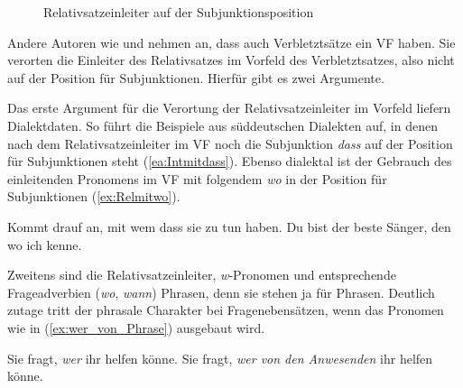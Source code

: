 \begin{figure}[!htbp]
  \centering
  \caption{Relativsatzeinleiter auf der Subjunktionsposition}
  \label{fig:VerbletztRelativSubjunktion}
\end{figure}

Andere Autoren wie \citet[25--26, 32--33]{Woellstein2014} und \citet[396--397]{Schaefer2018_3Aufl} nehmen an, dass auch Verbletztsätze ein VF haben. Sie verorten die Einleiter des Relativsatzes im Vorfeld des Verbletztsatzes, also nicht auf der Position für Subjunktionen. Hierfür gibt es zwei Argumente. 

Das erste Argument für die Verortung der Relativsatzeinleiter im Vorfeld liefern Dialektdaten. So führt die \citet[50, §25]{Duden2022} Beispiele aus süddeutschen Dialekten auf, in denen nach dem Relativsatzeinleiter im VF noch die Subjunktion \textit{dass} auf der Position für Subjunktionen steht (\ref{ea:Intmitdass}). Ebenso dialektal ist der Gebrauch des einleitenden Pronomens im VF mit folgendem \textit{wo} in der Position für Subjunktionen (\ref{ex:Relmitwo}).

\ea \label{ea:RelIntimVF}
\ea \label{ea:Intmitdass} Kommt drauf an, mit wem dass sie zu tun haben.
\ex \label{ex:Relmitwo} Du bist der beste Sänger, den wo ich kenne.
\z 
\z 

Zweitens sind die Relativsatzeinleiter, \textit{w}-Pronomen und entsprechende Frageadverbien (\wzB \textit{wo}, \textit{wann}) Phrasen, denn sie stehen ja für Phrasen. Deutlich zutage tritt der phrasale Charakter bei Fragenebensätzen, wenn das Pronomen wie in (\ref{ex:wer_von_Phrase}) ausgebaut wird.

\ea \label{ea:Fragenebensatz}
\ea \label{ea:wer_Nebensatz} Sie fragt, \textit{wer} ihr helfen könne.
\ex \label{ex:wer_von_Phrase} Sie fragt, \textit{wer von den Anwesenden} ihr helfen könne.
\z 
\z 

